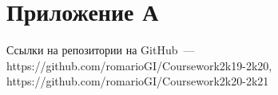 \section*{Приложение А}

	Ссылки на репозитории на GitHub~--- https://github.com/romarioGI/Coursework2k19-2k20, https://github.com/romarioGI/Coursework2k20-2k21	